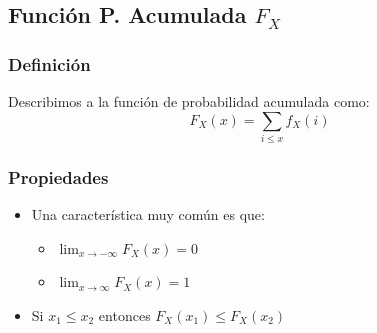 \documentclass[12pt, fleqn]{report}                             %
\theoremstyle{break}                                            %
\begin{document}
            \clearpage
            \subsection{Función P. Acumulada $F_X$}

                \subsubsection{Definición}

                    Describimos a la función de probabilidad acumulada como:
                    \begin{equation*}
                        F_X(x) = \sum_{i \leq x} f_{X}(i)
                    \end{equation*}

                \subsubsection{Propiedades}

                    \begin{itemize}
                        \item
                            Una característica muy común es que:
                            \begin{itemize}
                                \item $\lim_{x \to -\infty} F_X (x) = 0$
                                \item $\lim_{x \to \infty} F_X (x) = 1$
                            \end{itemize}
                        \item
                            Si $x_1 \leq x_2$ entonces $F_X(x_1) \leq F_X(x_2)$
                    \end{itemize}
\end{document}
